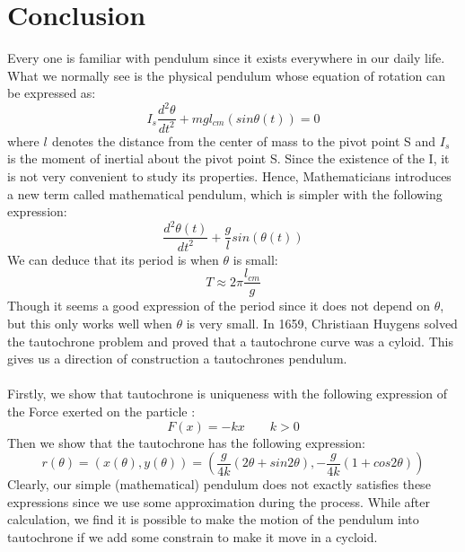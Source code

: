 \documentclass[12pt,a4paper]{article}
\begin{document}
\section{Conclusion}
 Every one is familiar with pendulum since it exists everywhere in our daily life. What we normally see is the physical pendulum whose equation of rotation can be expressed as:
$$ I_s\frac{d^2\theta}{dt^2}+mgl_{cm}(sin\theta(t))=0$$
where $l_{}$ denotes the distance from the center of mass to the pivot point S and $I_s$ is the moment of inertial about the pivot point S. Since the existence of the I, it is not very convenient to study its properties. Hence, Mathematicians introduces a new term called mathematical pendulum, which is simpler with the following expression:
$$ \frac{d^2\theta(t)}{dt^2}+\frac{g}{l}sin(\theta(t))$$
We can deduce that its period is when $\theta$ is small:
$$ T\approx2\pi \frac{l_{cm}}{g}$$
Though it seems a good expression of the period since it does not depend on $\theta$, but this only works well when $\theta$ is very small. In 1659, Christiaan Huygens solved the tautochrone problem and proved that a tautochrone curve was a cyloid. This gives us a direction of construction a tautochrones pendulum.\\
~\\
Firstly, we show that tautochrone is uniqueness with the following expression of the Force exerted on the particle :
$$F(x)=-kx \qquad k>0 $$
Then we show that the tautochrone has the following expression:
$$r(\theta)=(x(\theta),y(\theta))=(\frac{g}{4k}(2\theta+sin2\theta),-\frac{g}{4k}(1+cos2\theta))$$
Clearly, our simple (mathematical) pendulum does not exactly satisfies these expressions since we use some approximation during the process. While after calculation, we find it is possible to make the motion of the pendulum into tautochrone if we add some constrain to make it move in a cycloid.
\newpage
\end{document}
